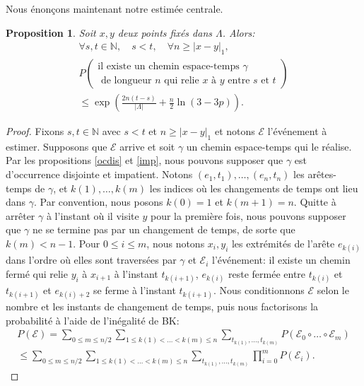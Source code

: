 \documentclass[titlepage,a4paper,12pt]{article}
\newcounter{d}
\newcounter{t}
\newcounter{p}
\newcounter{c}
\newcounter{a}
\newcounter{l}
\newtheorem{prop}[p]{Proposition}
\begin{document}
Nous énonçons maintenant notre estimée centrale.
\begin{prop} Soit 
$x,y$ deux points fixés dans $\Lambda$. Alors:
\begin{multline*}\forall s,t \in \mathbb{N}, \quad s<t, \quad \forall n \geqslant |x-y|_1,\\ P\left(\begin{array}{c}
\text{il existe un chemin espace-temps }\gamma\\ \text{ de longueur } n\text{ qui relie }x\text{ à }y \text{ entre }s\text{ et }t
\end{array}\right)\\  \leqslant \exp\left(\frac{2n(t-s)}{|\Lambda|}+\frac{n}{2}\ln(3-3p)\right).
\end{multline*}
\end{prop}
\begin{proof}
Fixons $s,t\in \mathbb{N}$ avec $s< t$ et $n\geqslant |x-y|_1$ et notons $\mathcal{E}$ l'événement à estimer. Supposons que $\mathcal{E}$ arrive et soit $\gamma$ un chemin espace-temps qui le réalise. Par les propositions \ref{ocdis} et \ref{imp}, nous pouvons supposer que $\gamma$ est d'occurrence disjointe et impatient. Notons $(e_1,t_1),\dots,(e_n,t_n)$ les arêtes-temps de $\gamma$, et $k(1),\dots,k(m)$ les indices où les changements de temps ont lieu dans $\gamma$. Par convention, nous posons $k(0) = 1$ et $k(m+1)=n$. Quitte à arrêter $\gamma$ à l'instant où il visite $y$ pour la première fois, nous pouvons supposer que $\gamma$ ne se termine pas par un changement de temps, de sorte que $k(m)< n-1$. Pour $0\leqslant i \leqslant m$, nous notons $x_i,y_i$ les extrémités de l'arête $e_{k(i)}$ dans l'ordre où elles sont traversées par $\gamma$ et $\mathcal{E}_i$ l'événement: il existe un chemin fermé qui relie $y_i$ à $x_{i+1}$  à l'instant $t_{k(i+1)}$, $e_{k(i)}$ reste fermée entre $t_{k(i)}$ et $t_{k(i+1)}$ et $e_{k(i)+2}$ se ferme à l'instant $t_{k(i+1)}$. Nous conditionnons $\mathcal{E}$ selon le nombre et les instants de changement de temps, puis nous factorisons la probabilité à l'aide de l'inégalité de BK:
\begin{multline*}
P(\mathcal{E})
= \sum_{0\leqslant m \leqslant n/2}\sum_{1\leqslant k(1)<\dots<k(m)\leqslant n}\sum_{t_{k(1)},\dots,t_{k(m)}}P(\mathcal{E}_0\circ\dots\circ \mathcal{E}_m)\\
\leqslant \sum_{0\leqslant m \leqslant n/2}\sum_{1\leqslant k(1)<\dots<k(m)\leqslant n}\sum_{t_{k(1)},\dots,t_{k(m)}} \prod_{i=0}^mP(\mathcal{E}_i).
\end{multline*}

\end{proof}
\end{document}
